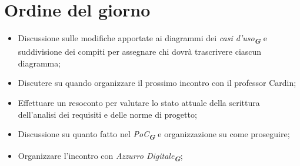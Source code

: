 

\section{Ordine del giorno}

\begin{itemize}
    \item Discussione sulle modifiche apportate ai diagrammi dei \emph{casi d'uso}\textsubscript{\textit{\textbf{G}}} e suddivisione dei compiti per assegnare chi dovrà trascrivere ciascun diagramma;   
    \item Discutere su quando organizzare il prossimo incontro con il professor Cardin;
    \item Effettuare un resoconto per valutare lo stato attuale della scrittura dell'analisi dei requisiti e delle norme di progetto;
    \item Discussione su quanto fatto nel \emph{PoC}\textsubscript{\textit{\textbf{G}}} e organizzazione su come proseguire;
    \item Organizzare l'incontro con \emph{Azzurro Digitale}\textsubscript{\textit{\textbf{G}}};
\end{itemize}
